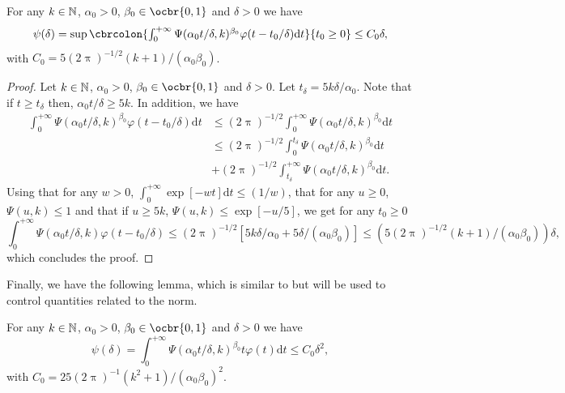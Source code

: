 \begin{lemma}
	\label{lemma:tail_chi_square_int}
	For any $k \in \mathbb{N}$, $\alpha_0>0$, $\beta_0 \in \ocbr{0,1}$ and $\delta > 0$ we have \begin{equation} \psi(\delta) = \textstyle{\sup \cbrcolon{\int_0^{+\infty} \Psi(\alpha_0 t/\delta, k)^{\beta_0} \varphi(t - t_0/\delta) \mathrm{d} t}{t_0 \geq 0}} \leq C_0 \delta , \end{equation} with $C_0 = 5(2\uppi)^{-1/2}(k+1)/(\alpha_0 \beta_0)$.
\end{lemma}

\begin{proof}
	Let $k \in \mathbb{N}$, $\alpha_0 >0$, $\beta_0 \in \ocbr{0,1}$ and $\delta > 0$.
	Let $t_{\delta} = 5 k \delta /\alpha_0$.
	Note that if $t \geq t_\delta$ then, $\alpha_0 t /\delta \geq 5k$.
	In addition, we have \begin{align} \textstyle \int_0^{+\infty} \Psi(\alpha_0 t/\delta, k)^{\beta_0} \varphi(t - t_0/\delta) \mathrm{d} t & \textstyle \leq (2 \uppi)^{-1/2} \int_0^{+\infty} \Psi(\alpha_0 t/\delta, k)^{\beta_0} \mathrm{d} t \\ & \textstyle \leq (2 \uppi)^{-1/2} \int_0^{t_\delta} \Psi(\alpha_0 t/\delta, k)^{\beta_0} \mathrm{d} t \\&+ (2 \uppi)^{-1/2} \int_{t_\delta}^{+\infty} \Psi(\alpha_0 t/\delta, k)^{\beta_0} \mathrm{d} t .
	\end{align}
	Using that for any $w >0$, $\int_0^{+\infty} \exp[-w t] \mathrm{d} t \leq (1/w)$, that for any $u \geq 0$, $\Psi(u, k) \leq 1$ and that if $u \geq 5k$, $\Psi(u,k) \leq \exp[-u/5]$, we get for any $t_0 \geq 0$ \begin{equation} \textstyle \int_0^{+\infty} \Psi(\alpha_0 t/\delta, k) \varphi(t - t_0/\delta) \leq (2\uppi)^{-1/2} [5k \delta/\alpha_0 + 5 \delta/(\alpha_0 \beta_0)] \leq (5(2\uppi)^{-1/2}(k+1)/(\alpha_0\beta_0)) \delta , \end{equation} which concludes the proof.
\end{proof}

Finally, we have the following lemma, which is similar to  but will be used to control quantities related to the norm.

\begin{lemma}
	\label{lemma:tail_chi_square_int_duo}
	For any $k \in \mathbb{N}$, $\alpha_0>0$, $\beta_0 \in \ocbr{0,1}$ and $\delta > 0$ we have \begin{equation} \psi(\delta) = \textstyle{ \int_0^{+\infty} \Psi(\alpha_0 t/\delta, k)^{\beta_0} t \varphi(t) \mathrm{d} t} \leq C_0 \delta^2 , \end{equation} with $C_0 = 25(2\uppi)^{-1}(k^2+1)/(\alpha_0\beta_0)^2$.
\end{lemma}

